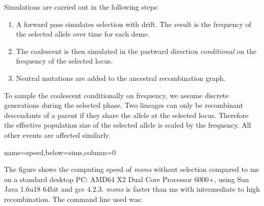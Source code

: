 \documentclass[portrait,final]{baposter}
\begin{document}
\begin{poster}
{Simulations are carried out in the following steps:
\begin{enumerate}
  \item A forward pass simulates selection with drift. The
  result is the frequency of the selected allele over time for each deme.
  \item The coalescent is then simulated in the pastward direction {\em
  conditional} on the frequency of the selected locus.
  \item Neutral mutations are added to the ancestral recombination graph.
\end{enumerate}
To sample the coalescent conditionally on frequency,  we assume discrete generations 
during the selected phase. Two lineages can only be recombinant
descendants of a parent if they share the allele at the selected locus. Therefore the
effective population size of the selected allele is scaled by the frequency.
All other events are affected similarly. 
\vspace{0.4em}
}

{name=speed,below=sims,column=0}{


The figure shows the computing speed of {\it msms} without selection compared to
{\sc ms} on a standard desktop PC:  AMD64 X2 Dual Core Processor 6000+, using Sun
Java 1.6u18 64bit and gcc 4.2.3.
{\it msms} is faster than {\sc ms} with intermediate to high
recombination. The command line used was:

}
\end{poster}
\end{document}
